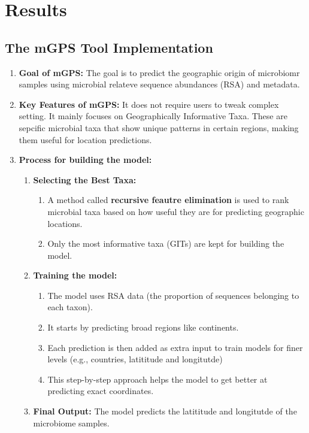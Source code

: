 \section{Results}
\subsection{The mGPS Tool Implementation}
\begin{enumerate}
    \item \textbf{Goal of mGPS:} The goal is to predict the geographic origin of microbiomr samples using microbial relateve sequence abundances (RSA) and metadata.
    \item \textbf{Key Features of mGPS:} It does not require users to tweak complex setting. It mainly focuses on Geographically Informative Taxa.
    These are sepcific microbial taxa that show unique patterns in certain regions, making them useful for location predictions. 
    \item \textbf{Process for building the model:}
    \begin{enumerate}
        \item \textbf{Selecting the Best Taxa:}
        \begin{enumerate}
            \item A method called \textbf{recursive feautre elimination} is used to rank microbial taxa based on how useful they are for predicting geographic locations.
            \item Only the most informative taxa (GITs) are kept for building the model. 
        \end{enumerate}
        \item \textbf{Training the model:}
        \begin{enumerate}
            \item The model uses RSA data (the proportion of sequences belonging to each taxon).
            \item It starts by predicting broad regions like continents.
            \item Each prediction is then added as extra input to train models for finer levels (e.g., countries, latititude and longitutde) 
            \item This step-by-step approach helps the model to get better at predicting exact coordinates. 
        \end{enumerate}
        \item \textbf{Final Output:} The model predicts the latititude and longitutde of the microbiome samples.

\end{enumerate}
\end{enumerate}
